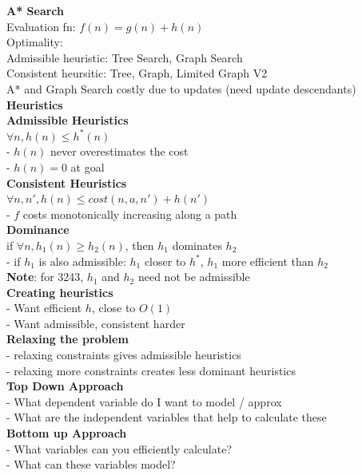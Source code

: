 \documentclass[10pt, a4paper]{article}
\newcommand{\highlight}[1]{{\color{red}\textbf{#1}}}
\newcommand{\red}[1]{{\color{red}#1}}
\newcommand{\green}[1]{{\color{ForestGreen}#1}}
\newcommand{\header}[1]{{\normalsize\textbf{#1}}}
\newcommand{\tab}[0]{\hspace*{2mm}}
\begin{document}
\begin{multicols*}{3}
	  \textbf{A* Search}\\
	  Evaluation fn: \green{$f(n) = g(n) + h(n)$}\\
	  Optimality:\\
	  \tab Admissible heuristic: Tree Search, Graph Search\\
	  \tab Consistent heursitic: Tree, Graph, Limited Graph V2\\
	  A* and Graph Search \red{costly} due to updates (need update descendants)\\

	  \header{Heuristics}\\
	  \textbf{Admissible Heuristics}\\
	  $\forall n, h(n) \leq h^{*}(n)$\\
	  \tab - $h(n)$ never overestimates the cost\\
	  \tab - $h(n) = 0$ at goal\\

	  \textbf{Consistent Heuristics}\\
	  $\forall n, n', h(n) \leq cost(n, a, n') + h(n')$\\
	  \tab - $f$ costs monotonically increasing along a path\\

	  \textbf{Dominance}\\
	  if $\forall n, h_{1}(n) \geq h_{2}(n)$, then $h_{1}$ dominates $h_{2}$\\
	  - if $h_{1}$ is also admissible: $h_{1}$ \green{closer} to $h^{*}$, $h_{1}$ more \green{efficient} than $h_{2}$\\
	  \highlight{Note}: for 3243, $h_{1}$ and $h_{2}$ need not be admissible\\

	  \textbf{Creating heuristics}\\
	  - Want \green{efficient} $h$, close to $O(1)$\\
	  - Want \green{admissible}, consistent harder\\
	  \textbf{Relaxing the problem}\\
	  \tab - relaxing constraints gives admissible heuristics\\
	  \tab - relaxing more constraints creates \red{less} dominant heuristics\\
	  \textbf{Top Down Approach}\\
	  - What dependent variable do I want to model / approx\\
	  - What are the independent variables that help to calculate these\\
	  \textbf{Bottom up Approach}\\
	  - What variables can you efficiently calculate?\\
	  - What can these variables model?\\


\end{multicols*}
\end{document}
